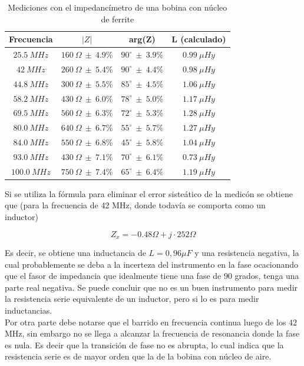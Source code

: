 \documentclass[a4paper,10pt]{article}
\begin{document}
		\begin{table}[!htp]
			\centering
			\begin{tabular}{|c|c|c|c|}
				\hline
				Frecuencia & $\left|Z\right|$ & arg(Z)  & L (calculado) \\
				\hline
				$25.5~MHz$ & $160~\Omega~\pm~4.9\%$ & $90^{\circ}~\pm~3.9\%$ & 
				$0.99~\mu Hy$ \\
				\hline
				$42~MHz$ & $260~\Omega~\pm~5.4\%$ & $90^{\circ}~\pm~4.4\%$ & 
				$0.98~\mu Hy$\\
				\hline
				$44.8~MHz$ & $300~\Omega~\pm~5.5\%$ & $85^{\circ}~\pm~4.5\%$ & 
				$1.06~\mu Hy$ \\
				\hline
				$58.2~MHz$ & $430~\Omega~\pm~6.0\%$ & $78^{\circ}~\pm~5.0\%$ & 
				$1.17~\mu Hy$ \\
				\hline									
				$69.5~MHz$ & $560~\Omega~\pm~6.3\%$ & $72^{\circ}~\pm~5.3\%$ & 
				$1.28~\mu Hy$ \\
				\hline									
				$80.0~MHz$& $640~\Omega~\pm~6.7\%$ & $55^{\circ}~\pm~5.7\%$ & 
				$1.27~\mu Hy$ \\
				\hline									
				$84.0~MHz$ & $550~\Omega~\pm~6.8\%$ & $45^{\circ}~\pm~5.8\%$ & 
				$1.04~\mu Hy$ \\
				\hline									
				$93.0~MHz$ & $430~\Omega~\pm~7.1\%$ & $70^{\circ}~\pm~6.1\%$ & 
				$0.73~\mu Hy$ \\
				\hline									
				$100.0~MHz$ & $750~\Omega~\pm~7.4\%$ & $65^{\circ}~\pm~6.4\%$ & 
				$1.19~\mu Hy$ \\
				\hline			
			\end{tabular}
			\caption{Mediciones con el impedanc\'imetro de una bobina con 
			n\'ucleo de ferrite} \label{tabIMPbobina}
		\end{table}	
		
		\indent Si se utiliza la f\'ormula para eliminar el error siste\'atico 
		de la medic\'on se obtiene que (para la frecuencia de 42 MHz, donde 
		todav\'ia se comporta como un inductor)
		
		$$Z_x=-0.48\Omega+j\cdot 252\Omega$$
		
		\indent Es decir, se obtiene una inductancia de $L=0,96 \mu F$ y una 
		resistencia negativa, la cual probablemente se deba a la incerteza del 
		instrumento en la fase ocacionando que el fasor de impedancia que 
		idealmente tiene una fase de 90 grados, tenga una parte real negativa. 
		Se puede concluir que no es un buen instrumento para medir la 
		resistencia serie equivalente de un inductor, pero si lo es para medir 
		inductancias. \\
		\indent Por otra parte debe notarse que el barrido en frecuencia 
		continua luego de los 42 MHz, sin embargo no se llega a alcanzar la 
		frecuencia de resonancia donde la fase es nula. Es decir que la 
		transici\'on de fase no es abrupta, lo cual indica que la resistencia 
		serie es de mayor orden que la de la bobina con n\'ucleo de aire. 
\end{document}
